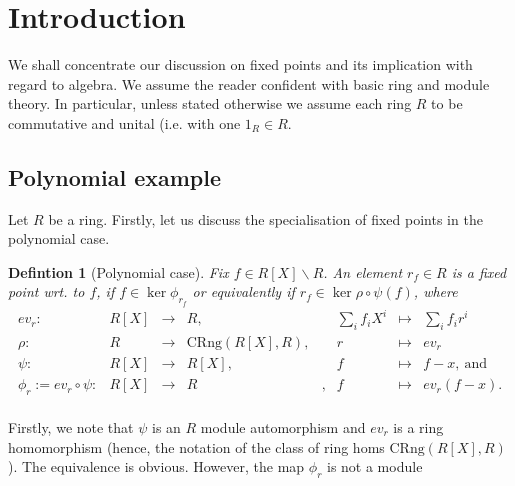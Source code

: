 \documentclass[10pt,a4paper]{article}
\author{moi}
\newtheorem{defi}{Defintion}
\begin{document}
\section{Introduction}
We shall concentrate our discussion on fixed points and its implication with regard to algebra. We assume the reader confident with basic ring and module theory. In particular, unless stated otherwise we assume each ring $R$ to be commutative and unital (i.e. with one $1_R \in R$.
\subsection{Polynomial example}
Let $R$ be a ring. Firstly, let us discuss the specialisation of fixed points in the polynomial case.
\begin{defi}[Polynomial case]
Fix $f \in R[X]\backslash R$. An element $r_f \in R$ is a fixed point wrt. to $f$, if $f \in \ker \phi_{r_f}$ or equivalently if $r_f \in \ker \rho \circ \psi (f)$, where
$$\begin{array}{rrclcrcl}
ev_r : & R[X] & \longrightarrow & R,&& \sum_i f_i X^i & \longmapsto & \sum_i f_i r^i\\
\rho : &R& \longrightarrow &\mathrm{CRng}(R[X],R),&& r &\longmapsto& ev_r\\%
\psi :& R[X] &\longrightarrow& R[X],&& f &\longmapsto &f - x,\ \mathrm{and}\\
\phi_r := ev_r \circ \psi :& R[X]& \longrightarrow& R&,& f &\longmapsto& ev_r (f - x).\\
\end{array}$$
\end{defi}
Firstly, we note that $\psi$ is an $R$ module automorphism and $ev_r$ is a ring homomorphism (hence, the notation of the class of ring homs $\mathrm{CRng}(R[X],R)$). The equivalence is obvious. However, the map $\phi_r$ is not a module 
\end{document}
